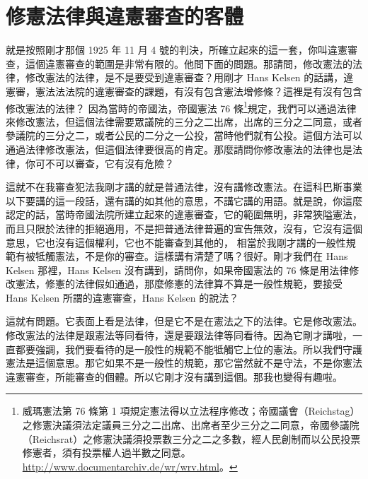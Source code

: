 \section{修憲法律與違憲審查的客體}

\hypertarget{w05:cue:317}{}就是按照剛才那個 1925 年 11 月 4 號的判決，所確立起來的這一套，你叫違憲審查，這個違憲審查的範圍是非常有限的。他問下面的問題。那請問，修改憲法的法律，修改憲法的法律，是不是要受到違憲審查？用剛才 Hans Kelsen 的話講，違憲審，憲法法法院的違憲審查的課題，有沒有包含憲法增修條？這裡是有沒有包含修改憲法的法律？
\hypertarget{w05:cue:318}{}因為當時的帝國法，帝國憲法 76 條\footnote{威瑪憲法第 76 條第 1 項規定憲法得以立法程序修改；帝國議會（Reichstag）之修憲決議須法定議員三分之二出席、出席者至少三分之二同意，帝國參議院（Reichsrat）之修憲決議須投票數三分之二之多數，經人民創制而以公民投票修憲者，須有投票權人過半數之同意。\url{http://www.documentarchiv.de/wr/wrv.html}。}規定，我們可以通過法律來修改憲法，但這個法律需要眾議院的三分之二出席，出席的三分之二同意，或者參議院的三分之二，或者公民的二分之一公投，當時他們就有公投。這個方法可以通過法律修改憲法，但這個法律要很高的肯定。那麼請問你修改憲法的法律也是法律，你可不可以審查，它有沒有危險？

\hypertarget{w05:cue:319}{}這就不在我審查犯法我剛才講的就是普通法律，沒有講修改憲法。在這科巴斯事業以下要講的這一段話，還有講的如其他的意思，不講它講的用語。就是說，你這麼認定的話，當時帝國法院所建立起來的違憲審查，它的範圍無明，非常狹隘憲法，而且只限於法律的拒絕適用，不是把普通法律普遍的宣告無效，沒有，它沒有這個意思，它也沒有這個權利，它也不能審查到其他的，
\hypertarget{w05:cue:320}{}相當於我剛才講的一般性規範有被牴觸憲法，不是你的審查。這樣講有清楚了嗎？很好。剛才我們在 Hans Kelsen 那裡，Hans Kelsen 沒有講到，請問你，如果帝國憲法的 76 條是用法律修改憲法，修憲的法律假如通過，那麼修憲的法律算不算是一般性規範，要接受 Hans Kelsen 所謂的違憲審查，Hans Kelsen 的說法？

\hypertarget{w05:cue:321}{}這就有問題。它表面上看是法律，但是它不是在憲法之下的法律。它是修改憲法。修改憲法的法律是跟憲法等同看待，還是要跟法律等同看待。因為它剛才講啦，一直都要強調，我們要看待的是一般性的規範不能牴觸它上位的憲法。所以我們守護憲法是這個意思。那它如果不是一般性的規範，那它當然就不是守法，不是你憲法違憲審查，所能審查的個體。所以它剛才沒有講到這個。那我也變得有趣啦。

